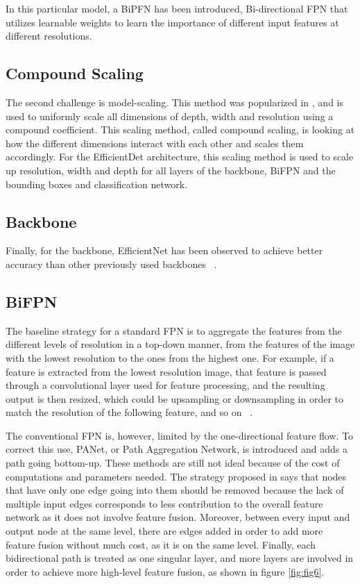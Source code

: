 In this particular model, a BiPFN has been introduced, Bi-directional FPN that utilizes learnable weights to learn the importance of different input features at different resolutions.

\subsection{Compound Scaling}

The second challenge is model-scaling. This method was popularized in \cite{carte10}, and is used to uniformly scale all dimensions of depth, width and resolution using a compound coefficient. This scaling method, called compound scaling, is looking at how the different dimensions interact with each other and scales them accordingly. For the EfficientDet architecture, this scaling method is used to scale up resolution, width and depth for all layers of the backbone, BiFPN and the bounding boxes and classification network.

\subsection{Backbone}

Finally, for the backbone, EfficientNet has been observed to achieve better accuracy than other previously used backbones ~\cite{carte8}. 

\subsection{BiFPN}

The baseline strategy for a standard FPN is to aggregate the features from the different levels of resolution in a top-down manner, from the features of the image with the lowest resolution to the ones from the highest one. For example, if a feature is extracted from the lowest resolution image, that feature is passed through a convolutional layer used for feature processing, and the resulting output is then resized, which could be upsampling or downsampling in order to match the resolution of the following feature, and so on ~\cite{carte8}.

The conventional FPN is, however, limited by the one-directional feature flow. To correct this use, PANet, or Path Aggregation Network, is introduced and adds a path going bottom-up. These methods are still not ideal because of the cost of computations and parameters needed. The strategy proposed in \cite{carte8} says that nodes that have only one edge going into them should be removed because the lack of multiple input edges corresponds to less contribution to the overall feature network as it does not involve feature fusion. Moreover, between every input and output node at the same level, there are edges added in order to add more feature fusion without much cost, as it is on the same level. Finally, each bidirectional path is treated as one singular layer, and more layers are involved in order to achieve more high-level feature fusion, as shown in figure \ref{fig:fig6}.

